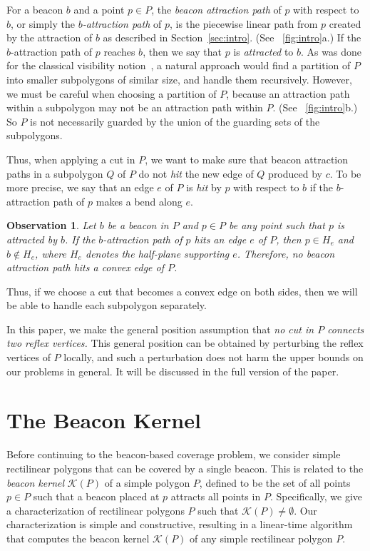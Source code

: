 \documentclass[11pt]{article}
\newcommand{\Kernel}{\mathcal{K}}
\newtheorem{observation}{Observation}
\theoremstyle{definition}
\begin{document}
For a beacon $b$ and a point $p\in P$, the \emph{beacon attraction path} of $p$ with respect to $b$,
or simply the \emph{$b$-attraction path} of $p$,
is the piecewise linear path from $p$ created by the attraction of $b$
as described in Section~\ref{sec:intro}.
(See \figurename~\ref{fig:intro}a.)
If the $b$-attraction path of $p$ reaches $b$, then we say that $p$ is \emph{attracted} to $b$.
As was done for the classical visibility notion~\cite{o-apragt-83,ghks-ggprp-96},
a natural approach would find a partition of $P$ into smaller subpolygons of similar size,
and handle them recursively.
However, we must be careful when choosing a partition of $P$, because
an attraction path within a subpolygon may not be an attraction path
within $P$. (See \figurename~\ref{fig:intro}b.)
So $P$ is not necessarily guarded by the union of the guarding sets of the subpolygons.

Thus, when applying a cut in $P$, we want to make sure that
beacon attraction paths in a subpolygon $Q$ of $P$ do not \emph{hit} the new edge
of $Q$ produced by $c$.
To be more precise, we say that an edge $e$ of $P$ is \emph{hit} by $p$ with respect to $b$
if the $b$-attraction path of $p$ makes a bend along $e$.
\begin{observation} \label{obs:convex_edge}
 Let $b$ be a beacon in $P$ and $p\in P$ be any point
 such that $p$ is attracted by $b$.
 If the $b$-attraction path of $p$ hits an edge $e$ of $P$,
 then $p\in H_e$ and $b\notin H_e$, where $H_e$ denotes the half-plane supporting $e$.
 Therefore, no beacon attraction path hits a convex edge of $P$.
\end{observation}
Thus, if we choose a cut that becomes a convex edge on both sides,
then we will be able to handle each subpolygon separately.

In this paper, we make the  general position assumption 
that \textit{no cut in $P$ connects two reflex vertices.}
This general position can be obtained by perturbing the reflex vertices of $P$ locally,
and such a perturbation does not harm the upper bounds on our problems in general.
It will be discussed in the full version of the paper.





\section{The Beacon Kernel} \label{sec:kernel}


Before continuing to the beacon-based coverage problem,
we consider simple rectilinear polygons that can be covered by a single beacon.
This is related to the  \emph{beacon kernel} $\Kernel(P)$ of a simple polygon $P$,
defined to be the set of all points $p \in P$
such that a beacon placed at $p$ attracts all points in $P$.
Specifically, we give a characterization of rectilinear polygons $P$ such that $\Kernel(P) \neq \emptyset$.
Our characterization is  simple and constructive, resulting in a linear-time algorithm
that computes the beacon kernel $\Kernel(P)$ of any simple rectilinear polygon $P$.
\end{document}
